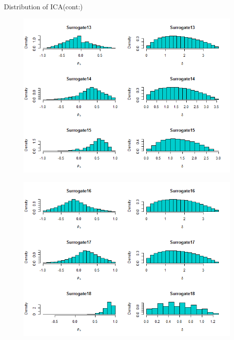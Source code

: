 \documentclass[a4paper,9pt]{beamer}\usepackage[]{graphicx}\usepackage[]{color}
\begin{document}
\begin{frame}{Distribution of ICA(cont:)}
\begin{minipage}{0.3\textwidth}
\begin{figure}[H]
\includegraphics[scale=0.32]{icaplots5.png}
\end{figure}
\end{minipage}
\hfill
\begin{minipage}{0.40\textwidth}
\begin{figure}[H]
\includegraphics[scale=0.32]{icaplots6.png}
\end{figure}

\end{minipage}
\end{frame}
\end{document}
